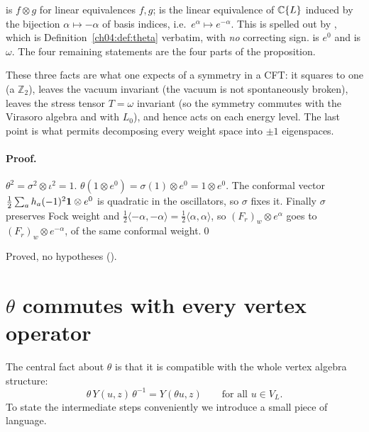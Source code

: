 \begin{dictionary}
 is $f\otimes g$ for linear equivalences $f,g$;
 is the linear equivalence of ${\mathbb{C}}\{L\}$ induced by the
bijection $\alpha\mapsto-\alpha$ of basis indices, i.e.\ $e^\alpha\mapsto e^{-\alpha}$. This is spelled
out by , which is Definition~\ref{ch04:def:theta} verbatim, with \emph{no}
correcting sign.  is $e^0$ and  is $\omega$. The four
remaining statements are the four parts of the proposition.
\end{dictionary}

\begin{physics}
These three facts are what one expects of a symmetry in a CFT: it squares to one (a $\mathbb Z_2$), leaves the vacuum invariant (the vacuum is not spontaneously broken), leaves the stress tensor $T=\omega$ invariant (so the symmetry commutes with the Virasoro algebra and with $L_0$), and hence acts on each energy level. The last point is what permits decomposing every weight space into $\pm1$ eigenspaces.
\end{physics}

\paragraph{Proof.} $\theta^2=\sigma^2\otimes\iota^2=1$. $\theta(1\otimes e^0)=\sigma(1)\otimes
e^0=1\otimes e^0$. The conformal vector $\tfrac12\sum_a h_a(-1)^2\mathbf{1}\otimes e^0$ is quadratic
in the oscillators, so $\sigma$ fixes it. Finally $\sigma$ preserves Fock weight and
$\tfrac12\langle-\alpha,-\alpha\rangle=\tfrac12\langle\alpha,\alpha\rangle$, so $(F_r)_w\otimes e^\alpha$
goes to $(F_r)_w\otimes e^{-\alpha}$, of the same conformal weight.\qed

\begin{status}
Proved, no hypotheses ().
\end{status}
\section{\texorpdfstring{$\theta$}{theta} commutes with every vertex operator}\label{ch04:sec:intertw}

The central fact about $\theta$ is that it is compatible with the whole vertex algebra structure:
\begin{equation}\label{ch04:eq:thetaY}
  \theta\,Y(u,z)\,\theta^{-1}=Y(\theta u,z)\qquad\text{for all }u\in V_L .
\end{equation}
To state the intermediate steps conveniently we introduce a small piece of language.


